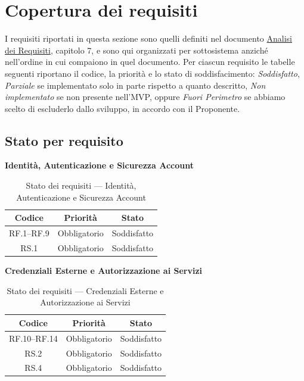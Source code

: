 \documentclass[12pt, a4paper]{article}
\begin{document}
\newpage
\section{Copertura dei requisiti}

I requisiti riportati in questa sezione sono quelli definiti nel documento \href{https://skynetunigroup.github.io/Code_Guardian/Documentazione/PB/analisi_dei_requisiti_v2.0.0.pdf}{Analisi dei Requisiti}, capitolo 7, e sono qui organizzati per sottosistema anziché nell'ordine in cui compaiono in quel documento. Per ciascun requisito le tabelle seguenti riportano il codice, la priorità e lo stato di soddisfacimento: \emph{Soddisfatto}, \emph{Parziale} se implementato solo in parte rispetto a quanto descritto, \emph{Non implementato} se non presente nell'MVP, oppure \emph{Fuori Perimetro} se abbiamo scelto di escluderlo dallo sviluppo, in accordo con il Proponente.

\subsection{Stato per requisito}

\medskip
\noindent\textbf{Identità, Autenticazione e Sicurezza Account}
\medskip

\begin{table}[H]
    \centering
    \renewcommand{\arraystretch}{1.3}
    \begin{tabular}{|c|c|c|}
        \hline
        \textbf{Codice} & \textbf{Priorità} & \textbf{Stato} \\ \hline
        RF.1--RF.9 & Obbligatorio & Soddisfatto \\ \hline
        RS.1 & Obbligatorio & Soddisfatto \\ \hline
    \end{tabular}
    \caption{Stato dei requisiti — Identità, Autenticazione e Sicurezza Account}
    \label{tab:req-identita}
\end{table}

\medskip
\noindent\textbf{Credenziali Esterne e Autorizzazione ai Servizi}
\medskip

\begin{table}[H]
    \centering
    \renewcommand{\arraystretch}{1.3}
    \begin{tabular}{|c|c|c|}
        \hline
        \textbf{Codice} & \textbf{Priorità} & \textbf{Stato} \\ \hline
        RF.10--RF.14 & Obbligatorio & Soddisfatto \\ \hline
        RS.2 & Obbligatorio & Soddisfatto \\ \hline
        RS.4 & Obbligatorio & Soddisfatto \\ \hline
    \end{tabular}
    \caption{Stato dei requisiti — Credenziali Esterne e Autorizzazione ai Servizi}
    \label{tab:req-credenziali}
\end{table}
\end{document}
